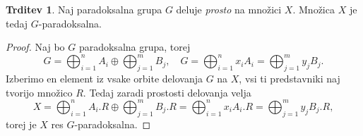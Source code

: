 \documentclass[11pt]{book}
\theoremstyle{definition}
\theoremstyle{zgled}
\theoremstyle{odprtproblem}
\theoremstyle{domacanaloga}
\newenvironment{dokaz}
    {\color{siva}\begin{proof}}
    {\end{proof}}
\theoremstyle{izrek}
\newtheorem*{trditev}{Trditev}
\begin{document}
\begin{trditev}
Naj paradoksalna grupa $G$ deluje {\em prosto} na množici $X$. Množica $X$ je tedaj $G$-paradoksalna.
\end{trditev}

\begin{dokaz}
Naj bo $G$ paradoksalna grupa, torej
\[
G = \bigoplus_{i=1}^n A_i \oplus \bigoplus_{j = 1}^m B_j, \quad 
G = \bigoplus_{i=1}^n x_i A_i = \bigoplus_{j = 1}^m y_j B_j.
\]
Izberimo en element iz vsake orbite delovanja $G$ na $X$, vsi ti predstavniki naj tvorijo množico $R$. Tedaj zaradi prostosti delovanja velja
\[
X = \bigoplus_{i = 1}^n A_i.R \oplus \bigoplus_{j = 1}^m B_j.R = \bigoplus_{i = 1}^n x_iA_i . R = \bigoplus_{j = 1}^m y_jB_j . R,
\]
torej je $X$ res $G$-paradoksalna.
\end{dokaz}
\end{document}
